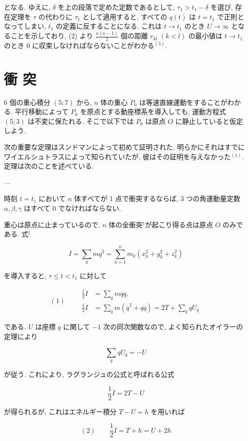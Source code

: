 \documentclass[dvipdfmx, leqno]{jsbook}
\begin{document}
となる. ゆえに, $\delta$ を上の段落で定めた定数であるとして, $\tau_1 > t_1 - \delta$ を選び, 存在定理を $\tau$ の代わりに $\tau_1$ として適用すると, すべての $q(t)$ は $t = t_1$ で正則となってしまい, $t_1$ の定義に反することになる. これは $t \to t_1$ のとき $U \to \infty$ となることを示しており, (2) より $\frac{n(n-1)}{2}$ 個の距離 $r_{kl}$ $(k < l)$ の最小値は $t \to t_1$ のとき $0$ に収束しなければならないことがわかる$^{(5)}$.

\section{衝 突}

6 個の重心積分 $(5;7)$ から, $n$ 体の重心 $P_0$ は等速直線運動をすることがわかる. 平行移動によって $P_0$ を原点とする動座標系を導入しても, 運動方程式 $(5;3)$ は不変に保たれる. そこで以下では $P_0$ は原点 $O$ に静止していると仮定しよう.

次の重要な定理はスンドマンによって初めて証明された. 明らかにそれはすでにワイエルシュトラスによって知られていたが, 彼はその証明を与えなかった$^{(1)}$. 定理は次のことを述べている.

---


時刻 $t = t_1$ において $n$ 体すべてが 1 点で衝突するならば, 3 つの角運動量定数 $\alpha, \beta, \gamma$ はすべて $0$ でなければならない.

重心は原点に止まっているので, $n$ 体の全衝突$^\dagger$が起こり得る点は原点 $O$ のみである. 式$^\ddagger$

$$I = \sum_{q} mq^2 = \sum_{k=1}^{n} m_k (x_k^2 + y_k^2 + z_k^2)$$

を導入すると, $\tau \leq t < t_1$ に対して

$$(1) \qquad \begin{aligned} \frac{1}{2} \dot{I} &= \sum_{q} mq\dot{q}, \\ \frac{1}{2} \ddot{I} &= \sum_{q} m(\dot{q}^2 + q\ddot{q}) = 2T + \sum_{q} qU_q \end{aligned}$$

である. $U$ は座標 $q$ に関して $-1$ 次の同次関数なので, よく知られたオイラーの定理により

$$\sum_{q} qU_q = -U$$

が従う. これにより, ラグランジュの公式と呼ばれる公式

$$\frac{1}{2} \ddot{I} = 2T - U$$

が得られるが, これはエネルギー積分 $T - U = h$ を用いれば

$$(2) \qquad \frac{1}{2} \ddot{I} = T + h = U + 2h$$
\end{document}
